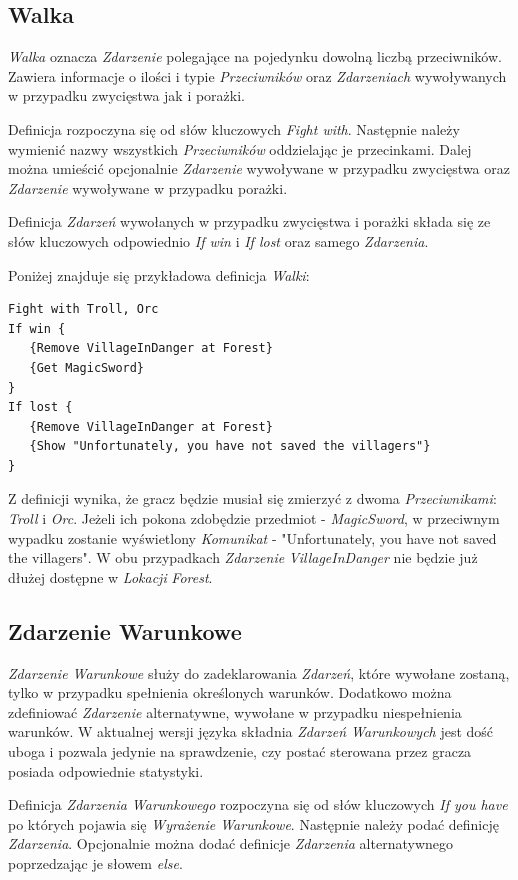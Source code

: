 \documentclass[openright]{xmgr}
\begin{document}
\subsection*{Walka}
\textit{Walka} oznacza \textit{Zdarzenie} polegające na pojedynku dowolną liczbą przeciwników. Zawiera informacje o ilości i typie \textit{Przeciwników} oraz \textit{Zdarzeniach} wywoływanych w przypadku zwycięstwa jak i porażki.

Definicja rozpoczyna się od słów kluczowych \textit{Fight with}. Następnie należy wymienić nazwy wszystkich \textit{Przeciwników} oddzielając je przecinkami. Dalej można umieścić opcjonalnie \textit{Zdarzenie} wywoływane w przypadku zwycięstwa oraz \textit{Zdarzenie} wywoływane w przypadku porażki.

Definicja \textit{Zdarzeń} wywołanych w przypadku zwycięstwa i porażki składa się ze słów kluczowych odpowiednio \textit{If win} i \textit{If lost} oraz samego \textit{Zdarzenia}.

Poniżej znajduje się przykładowa definicja \textit{Walki}:
\begin{verbatim}
Fight with Troll, Orc
If win {
   {Remove VillageInDanger at Forest}
   {Get MagicSword}
}
If lost {
   {Remove VillageInDanger at Forest}
   {Show "Unfortunately, you have not saved the villagers"}
}
\end{verbatim}

Z definicji wynika, że gracz będzie musiał się zmierzyć z dwoma \textit{Przeciwnikami}: \textit{Troll} i \textit{Orc}. Jeżeli ich pokona zdobędzie przedmiot - \textit{MagicSword}, w przeciwnym wypadku zostanie wyświetlony \textit{Komunikat} - "Unfortunately, you have not saved the villagers". W obu przypadkach \textit{Zdarzenie} \textit{VillageInDanger} nie będzie już dłużej dostępne w \textit{Lokacji} \textit{Forest}.

\subsection*{Zdarzenie Warunkowe}
\textit{Zdarzenie Warunkowe} służy do zadeklarowania \textit{Zdarzeń}, które wywołane zostaną, tylko w przypadku spełnienia określonych warunków. Dodatkowo można zdefiniować \textit{Zdarzenie} alternatywne, wywołane w przypadku niespełnienia warunków. W aktualnej wersji języka składnia \textit{Zdarzeń Warunkowych} jest dość uboga i pozwala jedynie na sprawdzenie, czy postać sterowana przez gracza posiada odpowiednie statystyki.

Definicja \textit{Zdarzenia Warunkowego} rozpoczyna się od słów kluczowych \textit{If you have} po których pojawia się \textit{Wyrażenie Warunkowe}. Następnie należy podać definicję \textit{Zdarzenia}. Opcjonalnie można dodać definicje \textit{Zdarzenia} alternatywnego poprzedzając je słowem \textit{else}.
\end{document}
